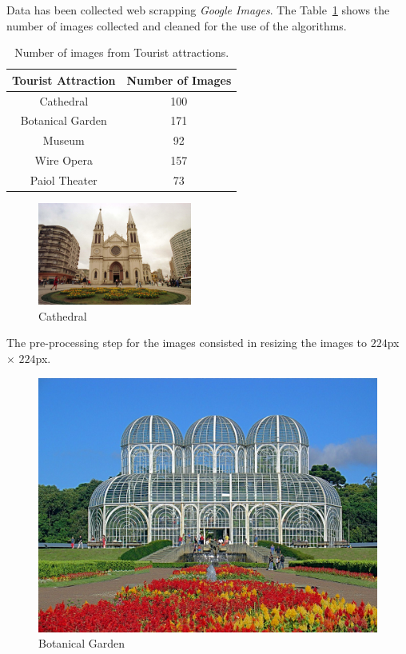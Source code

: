 \documentclass{article}
\begin{document}
  Data has been collected web scrapping \emph{Google Images}. The Table~\ref{tab:nfiguras}
  shows the number of images collected and cleaned for
  the use of the algorithms.
  \begin{table}[htb]
      \centering
      \caption{Number of images from Tourist attractions.}
      \label{tab:nfiguras}
      \vskip 0.15in

      \begin{tabular}{@{}cc@{}}

      \toprule
        \textbf{Tourist Attraction}& \textbf{Number of Images}  \\
      \midrule
        Cathedral                  & 100                        \\
        Botanical Garden           & 171                        \\
        Museum                     & 92                         \\
        Wire Opera                 & 157                        \\
        Paiol Theater              & 73                         \\
      \bottomrule
      \end{tabular}
  \end{table}
  \begin{figure}[htb]
    \centering
    \includegraphics[width=0.45\textwidth]{0.jpg}
    \caption{Cathedral}
    \label{fig:0jpg}
  \end{figure}

  The pre-processing step for the images consisted in resizing the images to
  $224$px $\times$ $224$px.
  \begin{figure}[hbt]
    \centering
    \includegraphics[width=.4\textwidth]{141.jpg}
    \caption{Botanical Garden}
  \end{figure}
\end{document}
